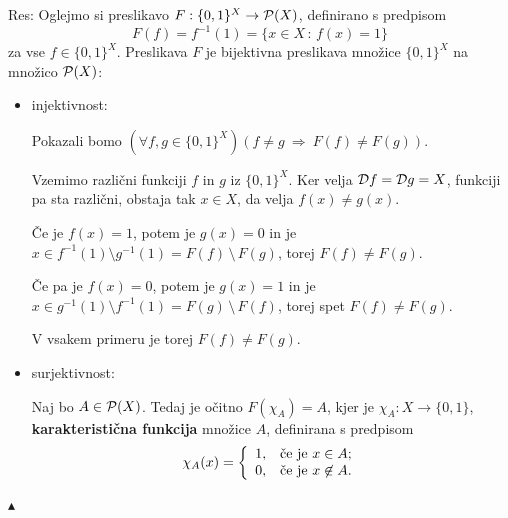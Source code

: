 \documentclass[11pt,paper=b5,footinclude,headinclude]{scrbook} %
\def\sledi {{~\Rightarrow~}}
\def\brez {{\,\setminus\,}}
\def\kz{{\hfill{\color{blue}$\blacktriangle$}}}%
\begin{document}
Res:
Oglejmo si preslikavo
$F:\{0,1\}^X\to {\cal P}(X)$, definirano s predpisom
$$F(f) = f^{-1}(1) = \{x\in X\,:\,f(x) = 1\}$$
za vse $f\in \{0,1\}^X$.
Preslikava $F$ je bijektivna preslikava množice $\{0,1\}^X$ na množico ${\cal P}(X)$:
\begin{itemize}
  \item injektivnost:

Pokazali bomo $(\forall f,g\in \{0,1\}^X)(f\neq g\sledi F(f)\neq F(g))$.

Vzemimo različni funkciji $f$ in $g$ iz $\{0,1\}^X$. Ker velja ${\cal D}f = {\cal D}g = X$, funkciji pa sta različni,
obstaja tak $x\in X$, da velja $f(x) \neq g(x)$.

Če je $f(x) = 1$, potem je $g(x) = 0$ in je $x\in f^{-1}(1) \setminus g^{-1}(1) = F(f)\brez F(g)$, torej $F(f)\neq F(g)$.

Če pa je $f(x) = 0$, potem je $g(x) = 1$ in je $x\in g^{-1}(1) \setminus f^{-1}(1) = F(g)\brez F(f)$, torej spet $F(f)\neq F(g)$.

V vsakem primeru je torej $F(f) \neq F(g)$.

  \item surjektivnost:

  Naj bo $A\in {\cal P}(X)$. Tedaj je očitno $F(\chi_A) = A$, kjer je ${\chi_A}:X\to \{0,1\}$, \textbf{karakteristična funkcija}
  množice $A$, definirana s predpisom
  $$\chi_A(x) = \left\{
  \begin{array}{ll}
              1, & \hbox{če je $x\in A$;} \\
              0, & \hbox{če je $x\not\in A$.}
            \end{array}
          \right.$$
\end{itemize}\kz
%
%
%
%
%
%
%
%
\end{document}
